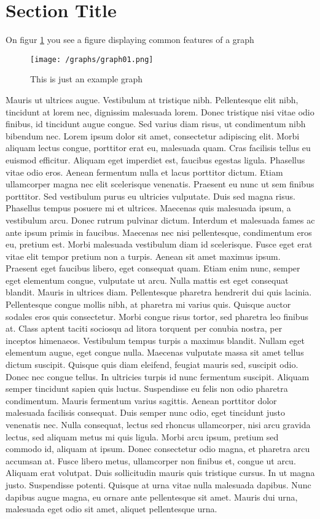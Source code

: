 \section{Section Title}
On figur \ref{fig:test-graph} you see a figure displaying common features of a graph
\begin{figure}[h]
\centering
\texttt{[image: /graphs/graph01.png]}
\caption{This is just an example graph}
\label{fig:test-graph}
\end{figure}

Mauris ut ultrices augue. Vestibulum at tristique nibh. Pellentesque elit nibh, tincidunt at lorem nec, dignissim malesuada lorem. Donec tristique nisi vitae odio finibus, id tincidunt augue congue. Sed varius diam risus, ut condimentum nibh bibendum nec. Lorem ipsum dolor sit amet, consectetur adipiscing elit. Morbi aliquam lectus congue, porttitor erat eu, malesuada quam. Cras facilisis tellus eu euismod efficitur. Aliquam eget imperdiet est, faucibus egestas ligula. Phasellus vitae odio eros. Aenean fermentum nulla et lacus porttitor dictum.
Etiam ullamcorper magna nec elit scelerisque venenatis. Praesent eu nunc ut sem finibus porttitor. Sed vestibulum purus eu ultricies vulputate. Duis sed magna risus. Phasellus tempus posuere mi et ultrices. Maecenas quis malesuada ipsum, a vestibulum arcu. Donec rutrum pulvinar dictum. Interdum et malesuada fames ac ante ipsum primis in faucibus. Maecenas nec nisi pellentesque, condimentum eros eu, pretium est. Morbi malesuada vestibulum diam id scelerisque. Fusce eget erat vitae elit tempor pretium non a turpis. Aenean sit amet maximus ipsum. Praesent eget faucibus libero, eget consequat quam.
Etiam enim nunc, semper eget elementum congue, vulputate ut arcu. Nulla mattis est eget consequat blandit. Mauris in ultrices diam. Pellentesque pharetra hendrerit dui quis lacinia. Pellentesque congue mollis nibh, at pharetra mi varius quis. Quisque auctor sodales eros quis consectetur. Morbi congue risus tortor, sed pharetra leo finibus at. Class aptent taciti sociosqu ad litora torquent per conubia nostra, per inceptos himenaeos. Vestibulum tempus turpis a maximus blandit.
Nullam eget elementum augue, eget congue nulla. Maecenas vulputate massa sit amet tellus dictum suscipit. Quisque quis diam eleifend, feugiat mauris sed, suscipit odio. Donec nec congue tellus. In ultricies turpis id nunc fermentum suscipit. Aliquam semper tincidunt sapien quis luctus. Suspendisse eu felis non odio pharetra condimentum. Mauris fermentum varius sagittis. Aenean porttitor dolor malesuada facilisis consequat. Duis semper nunc odio, eget tincidunt justo venenatis nec. Nulla consequat, lectus sed rhoncus ullamcorper, nisi arcu gravida lectus, sed aliquam metus mi quis ligula. Morbi arcu ipsum, pretium sed commodo id, aliquam at ipsum. Donec consectetur odio magna, et pharetra arcu accumsan at.
Fusce libero metus, ullamcorper non finibus et, congue ut arcu. Aliquam erat volutpat. Duis sollicitudin mauris quis tristique cursus. In ut magna justo. Suspendisse potenti. Quisque at urna vitae nulla malesuada dapibus. Nunc dapibus augue magna, eu ornare ante pellentesque sit amet. Mauris dui urna, malesuada eget odio sit amet, aliquet pellentesque urna.